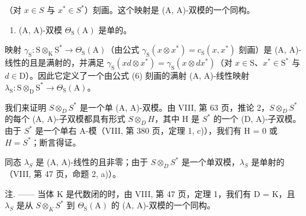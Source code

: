 （对 \(x \in S\) 与 \(x^{*} \in S^{*}\)）刻画。这个映射是 (A, A)-双模的一个同构。

\begin{enumerate}
\def\labelenumi{\alph{enumi})}
\setcounter{enumi}{1}
\tightlist
\item
  (A, A)-双模 \(\Theta_{\mathrm{S}}(\mathrm{A})\) 是单的。
\end{enumerate}

映射 \(\gamma_{\mathrm{S}}: \mathrm{S} \otimes_{\mathrm{K}} \mathrm{S}^{*} \to \Theta_{\mathrm{S}}(\mathrm{A})\)（由公式 \(\gamma_{\mathrm{S}}(x \otimes x^{*}) = c_{\mathrm{S}}(x, x^{*})\) 刻画）是 (A, A)-线性的且是满射的，并满足 \(\gamma_{\mathrm{S}}(xd \otimes x^{*}) = \gamma_{\mathrm{S}}(x \otimes dx^{*})\)（对 \(x \in \mathrm{S}\)、\(x^{*} \in \mathrm{S}^{*}\) 与 \(d \in \mathrm{D}\)）。因此它定义了一个由公式 (6) 刻画的满射 (A, A)-线性映射 \(\lambda_{\mathrm{S}}: \mathrm{S} \otimes_{\mathrm{D}} \mathrm{S}^{*} \to \Theta_{\mathrm{S}}(\mathrm{A})\)。

我们来证明 \(S \otimes_{D} S^{*}\) 是一个单 (A, A)-双模。由 VIII, 第 63 页，推论 2，\(S \otimes_{D} S^{*}\) 的每个 (A, A)-子双模都具有形式 \(S \otimes_{D} H\)，其中 H 是 \(S^{*}\) 的一个 (D, A)-子双模。由于 \(S^{*}\) 是一个单右 A-模（VIII, 第 380 页，定理 1, c)），我们有 H = 0 或 \(H = S^{*}\)；断言得证。

同态 \(\lambda_{S}\) 是 (A, A)-线性的且非零；由于 \(S \otimes_{D} S^{*}\) 是一个单双模，\(\lambda_{S}\) 是单射的（VIII, 第 47 页，命题 2, a)）。

注. —— 当体 K 是代数闭的时，由 VIII, 第 47 页，定理 1，我们有 D = K，且 \(\lambda_{S}\) 是从 \(S \otimes_{K} S^{*}\) 到 \(\Theta_{\mathrm{S}}(\mathrm{A})\) 的 (A, A)-双模的一个同构。
\relax{}
